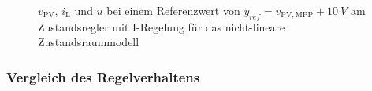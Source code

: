 \begin{figure}[H]
    \centering
    \caption[Validierung Regler mit I-Regelung (nicht-linear)]{$v_{\mathrm{PV}}$, $i_{\mathrm{L}}$ und $u$ bei einem Referenzwert von $y_{ref} = v_{\mathrm{PV,MPP}} + \SI{10}{V}$ am Zustandsregler mit I-Regelung für das nicht-lineare Zustandsraummodell}
    \label{fig:Bild25}
\end{figure}

\subsubsection{Vergleich des Regelverhaltens}


